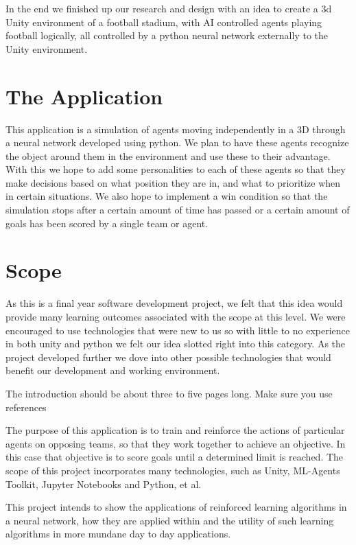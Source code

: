 In the end we finished up our research and design with an idea to create a 3d Unity environment of a football stadium, with AI controlled agents playing football logically, all controlled by a python neural network externally to the Unity environment.


\section{The Application}
This application is a simulation of agents moving independently in a 3D through a neural network developed using python. We plan to have these agents recognize the object around them in the environment and use these to their advantage. With this we hope to add some personalities to each of these agents so that they make decisions based on what position they are in, and what to prioritize when in certain situations. We also hope to implement a win condition so that the simulation stops after a certain amount of time has passed or a certain amount of goals has been scored by a single team or agent.

\section{Scope}
As this is a final year software development project, we felt that this idea would provide many learning outcomes associated with the scope at this level. We were encouraged to use technologies that were new to us so with little to no experience in both unity and python we felt our idea slotted right into this category. As the project developed further we dove into other possible technologies that would benefit our development and working environment.




The introduction should be about three to five pages long.
Make sure you use references~\cite{einstein}

The purpose of this application is to train and reinforce the actions of particular agents on opposing teams, so that they work together to achieve an objective. In this case that objective is to score goals until a determined limit is reached. The scope of this project incorporates many technologies, such as Unity, ML-Agents Toolkit, Jupyter Notebooks and Python, et al. 

This project intends to show the applications of reinforced learning algorithms in a neural network, how they are applied within and the utility of such learning algorithms in more mundane day to day applications.



